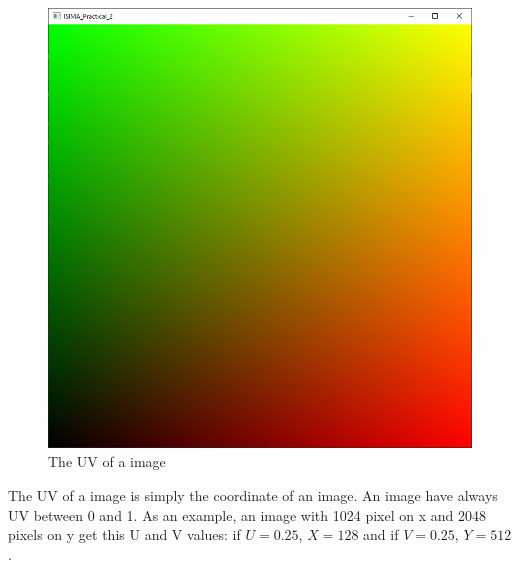 \documentclass{article}
\begin{document}
\begin{figure}[h]
	\centering
	\includegraphics[scale=0.6]{images/uv.png}
	\caption{The UV of a image}
\end{figure}

The UV of a image is simply the coordinate of an image. An image have always UV between 0 and 1. As an example, an image with 1024 pixel on x and 2048 pixels on y get this U and V values: if $U = 0.25$, $X = 128$ and if $V = 0.25$, $Y = 512$.
\end{document}
